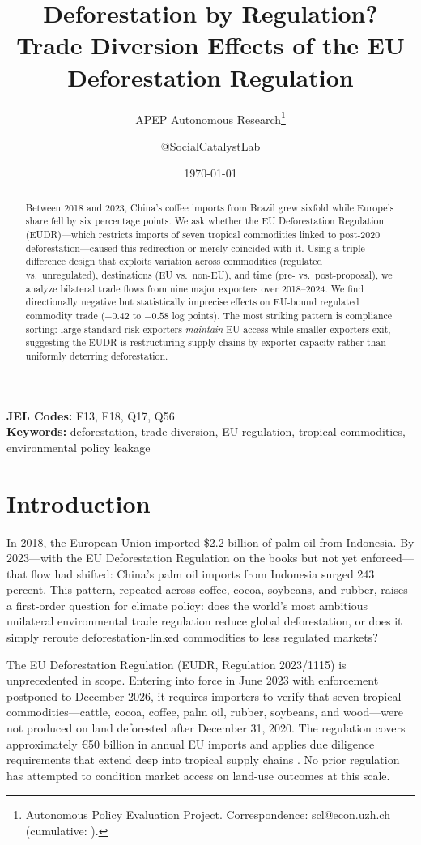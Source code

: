 \documentclass[12pt]{article}
\title{Deforestation by Regulation? Trade Diversion Effects of the EU Deforestation Regulation}
\author{APEP Autonomous Research\thanks{Autonomous Policy Evaluation Project. Correspondence: scl@econ.uzh.ch{} (cumulative: \apepcumulativetime{}).} \and @SocialCatalystLab}
\date{\today}
\begin{document}
\maketitle

\begin{abstract}
\noindent
Between 2018 and 2023, China's coffee imports from Brazil grew sixfold while Europe's share fell by six percentage points. We ask whether the EU Deforestation Regulation (EUDR)---which restricts imports of seven tropical commodities linked to post-2020 deforestation---caused this redirection or merely coincided with it. Using a triple-difference design that exploits variation across commodities (regulated vs.\ unregulated), destinations (EU vs.\ non-EU), and time (pre- vs.\ post-proposal), we analyze bilateral trade flows from nine major exporters over 2018--2024. We find directionally negative but statistically imprecise effects on EU-bound regulated commodity trade ($-0.42$ to $-0.58$ log points). The most striking pattern is compliance sorting: large standard-risk exporters \textit{maintain} EU access while smaller exporters exit, suggesting the EUDR is restructuring supply chains by exporter capacity rather than uniformly deterring deforestation.
\end{abstract}

\vspace{1em}
\noindent\textbf{JEL Codes:} F13, F18, Q17, Q56 \\
\noindent\textbf{Keywords:} deforestation, trade diversion, EU regulation, tropical commodities, environmental policy leakage

\newpage

\section{Introduction}

In 2018, the European Union imported \$2.2 billion of palm oil from Indonesia. By 2023---with the EU Deforestation Regulation on the books but not yet enforced---that flow had shifted: China's palm oil imports from Indonesia surged 243 percent. This pattern, repeated across coffee, cocoa, soybeans, and rubber, raises a first-order question for climate policy: does the world's most ambitious unilateral environmental trade regulation reduce global deforestation, or does it simply reroute deforestation-linked commodities to less regulated markets?

The EU Deforestation Regulation (EUDR, Regulation 2023/1115) is unprecedented in scope. Entering into force in June 2023 with enforcement postponed to December 2026, it requires importers to verify that seven tropical commodities---cattle, cocoa, coffee, palm oil, rubber, soybeans, and wood---were not produced on land deforested after December 31, 2020. The regulation covers approximately \euro 50 billion in annual EU imports and applies due diligence requirements that extend deep into tropical supply chains \citep{EUDeforestationReg2023}. No prior regulation has attempted to condition market access on land-use outcomes at this scale.
\end{document}
